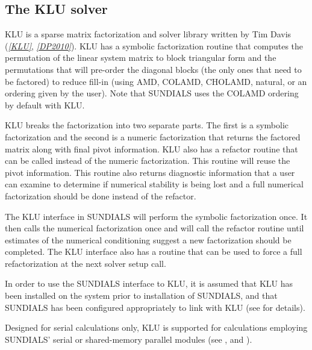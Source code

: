 \documentclass[letterpaper,10pt,english]{sphinxmanual}
\begin{document}
\subsection{The KLU solver}
\label{linear_solvers/SLS:the-klu-solver}
KLU is a sparse matrix factorization and solver library written by Tim
Davis (\label{linear_solvers/SLS:id1}{\hyperref[References:klu]{\emph{{[}KLU{]}}}}, \label{linear_solvers/SLS:id2}{\hyperref[References:dp2010]{\emph{{[}DP2010{]}}}}).   KLU has a symbolic factorization routine
that computes the permutation of the linear system matrix to block
triangular form and the permutations that will pre-order the diagonal
blocks (the only ones that need to be factored) to reduce fill-in
(using AMD, COLAMD, CHOLAMD, natural, or an ordering given by the
user).  Note that SUNDIALS uses the COLAMD ordering by default with
KLU.

KLU breaks the factorization into two separate parts.  The first is a
symbolic factorization and the second is a numeric factorization that
returns the factored matrix along with final pivot information.  KLU
also has a refactor routine that can be called instead of the numeric
factorization.  This routine will reuse the pivot information.  This
routine also returns diagnostic information that a user can examine to
determine if numerical stability is being lost and a full numerical
factorization should be done instead of the refactor.

The KLU interface in SUNDIALS will perform the symbolic factorization
once.  It then calls the numerical factorization once and will call
the refactor routine until estimates of the numerical conditioning
suggest a new factorization should be completed.  The KLU interface
also has a  routine that can be used to force a full
refactorization at the next solver setup call.

In order to use the SUNDIALS interface to KLU, it is
assumed that KLU has been installed on the system prior to
installation of SUNDIALS, and that SUNDIALS has been configured
appropriately to link with KLU (see {\hyperref[Install:installation]{\emph{}}} for details).

Designed for serial calculations only, KLU is supported for
calculations employing SUNDIALS' serial or shared-memory parallel
 modules (see {\hyperref[nvectors/NVector_Serial:nvectors-nvserial]{\emph{}}},
{\hyperref[nvectors/NVector_OpenMP:nvectors-openmp]{\emph{}}} and {\hyperref[nvectors/NVector_Pthreads:nvectors-pthreads]{\emph{}}}).
\end{document}
